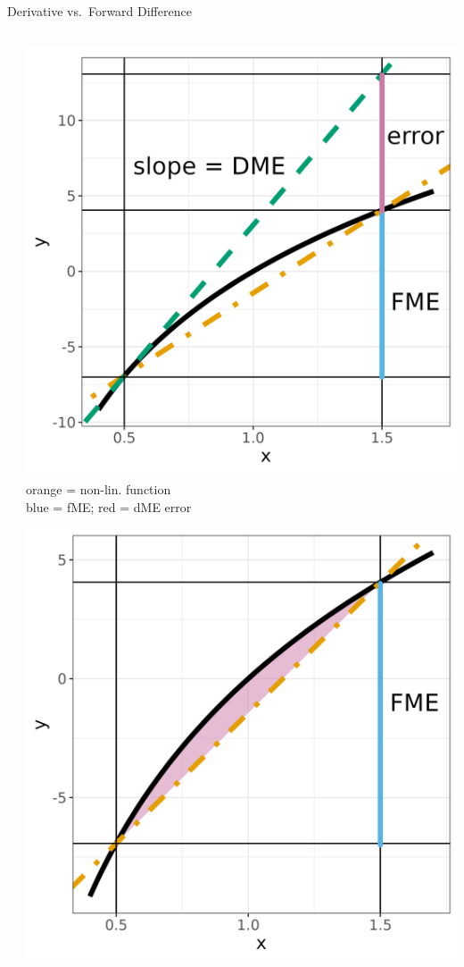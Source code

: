 \documentclass[11pt,compress,t,notes=noshow, aspectratio=169, xcolor=table]{beamer}
\begin{document}
\begin{frame}{Derivative vs.\ Forward Difference}
\begin{columns}[T,onlytextwidth]
\begin{column}{0.67\textwidth}
\end{column}

\begin{column}{0.33\textwidth}
    \centering
    \includegraphics[width=\linewidth]{figure_man/derivative_me_error.png}\\
    \scriptsize
    orange = non-lin. function\\
    blue = fME; red = dME error

    \includegraphics[width=0.8\linewidth]{figure_man/forward_me_deviation.png}
\end{column}
\end{columns}
\end{frame}
\end{document}
